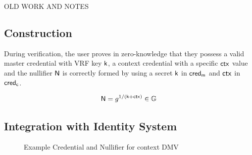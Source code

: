 \clearpage
OLD WORK AND NOTES


\subsection{Construction}
During verification, the user proves in zero-knowledge that they possess a valid master credential with VRF key $\mathsf{k}$, a context credential with a specific $\mathsf{ctx}$ value and the nullifier $\mathsf{N}$ is correctly formed by using a secret $\mathsf{k}$ in $\mathsf{cred_m}$ and $\mathsf{ctx}$ in $\mathsf{cred_c}$. 

\begin{equation}
\mathsf{N} = g^{1/(\mathsf{k} + \mathsf{ctx})} \in \mathbb{G}
\end{equation}

\subsection{Integration with Identity System}


\begin{figure}
        \begin{pchstack}[boxed, center, space=4em]
            \begin{pcvstack}
            \end{pcvstack}
            \pcvspace
            \begin{pcvstack}
            \end{pcvstack}
            \begin{pcvstack}
            \end{pcvstack}
        \end{pchstack}
    \caption{Example Credential and Nullifier for context DMV}
    \label{fig:two-creds}
\end{figure}


